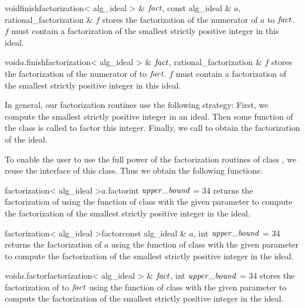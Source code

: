 \begin{fcode}{void}{finish}{factorization< alg_ideal > & $\mathit{fact}$,
    const alg_ideal & $a$, rational_factorization & $f$}%
  stores the factorization of the numerator of $a$ to $\mathit{fact}$.  $f$ must contain a factorization
  of the smallest strictly positive integer in this ideal.
\end{fcode}

\begin{cfcode}{void}{$a$.finish}{factorization< alg_ideal > & $\mathit{fact}$,
    rational_factorization & $f$}%
  stores the factorization of the numerator of  to $\mathit{fact}$.  $f$ must contain a
  factorization of the smallest strictly positive integer in this ideal.
\end{cfcode}



In general, our factorization routines use the following strategy: First, we compute the
smallest strictly positive integer in an ideal.  Then some function of the class
 is called to factor this integer.  Finally, we call 
to obtain the factorization of the ideal.

To enable the user to use the full power of the factorization routines of class
, we reuse the interface of this class.  Thus we obtain the
following functions:

\begin{cfcode}{factorization< alg_ideal >}{$a$.factor}{int $\upperbound$ = 34}
  returns the factorization of  using the function  of class
   with the given parameter to compute the factorization of the
  smallest strictly positive integer in the ideal.
\end{cfcode}

\begin{fcode}{factorization< alg_ideal >}{factor}{const alg_ideal & $a$,
    int $\upperbound$ = 34}%
  returns the factorization of $a$ using the function  of class
   with the given parameter to compute the factorization of the
  smallest strictly positive integer in the ideal.
\end{fcode}

\begin{cfcode}{void}{$a$.factor}{factorization< alg_ideal > & $\mathit{fact}$,
    int $\upperbound$ = 34}%
  stores the factorization of  to $\mathit{fact}$ using the function  of
  class  with the given parameter to compute the factorization of
  the smallest strictly positive integer in the ideal.
\end{cfcode}

